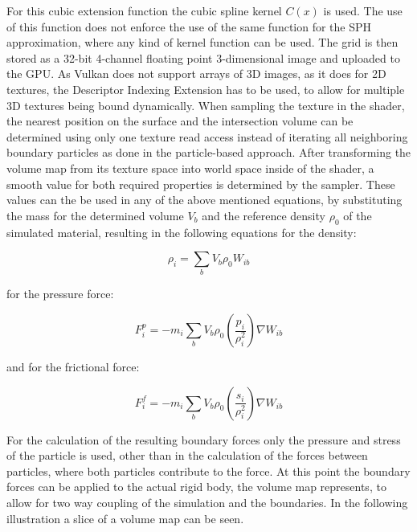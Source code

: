 \documentclass[intern]{cgMA}
\begin{document}
    For this cubic extension function the cubic spline kernel $C(x)$ \cite{doi:10.1146/annurev.aa.30.090192.002551} is used. The use of this function does not enforce the use of the same function for the SPH approximation, where any kind of kernel function can be used. \cite{10.1145/3359566.3360077}
    The grid is then stored as a 32-bit 4-channel floating point 3-dimensional image and uploaded to the GPU. As Vulkan does not support arrays of 3D images, as it does for 2D textures, the Descriptor Indexing Extension has to be used, to allow for multiple 3D textures being bound dynamically. When sampling the texture in the shader, the nearest position on the surface and the intersection volume can be determined using only one texture read access instead of iterating all neighboring boundary particles as done in the particle-based approach. After transforming the volume map from its texture space into world space inside of the shader, a smooth value for both required properties is determined by the sampler. These values can the be used in any of the above mentioned equations, by substituting the mass for the determined volume $V_b$ and the reference density $\rho_0$ of the simulated material, resulting in the following equations for the density:

    \begin{equation}
        \rho_i = \sum_b V_b \rho_0 W_{ib}
    \end{equation}

    for the pressure force:

    \begin{equation}
        F_i^p = -m_i \sum_{b} V_b \rho_0 (\frac{p_i}{\rho_i^2}) \nabla W_{ib}
    \end{equation}

    and for the frictional force:

    \begin{equation}
        F_i^f = -m_i \sum_{b} V_b \rho_0 (\frac{s_i}{\rho_i^2}) \nabla W_{ib}
    \end{equation}


    For the calculation of the resulting boundary forces only the pressure and stress of the particle is used, other than in the calculation of the forces between particles, where both particles contribute to the force. At this point the boundary forces can be applied to the actual rigid body, the volume map represents, to allow for two way coupling of the simulation and the boundaries. In the following illustration a slice of a volume map can be seen.
\end{document}
